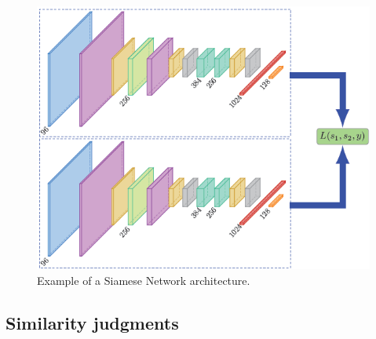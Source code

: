 \documentclass[conference]{IEEEtran}
\begin{document}
					\begin{figure}[!ht]
						\centerline{\includegraphics[width=\linewidth]{imgs/siamese_architecture.png}}
						\caption{Example of a Siamese Network architecture.}
						\label{fig:6}
					\end{figure}
			
			\subsection{Similarity judgments}
				
\end{document}
